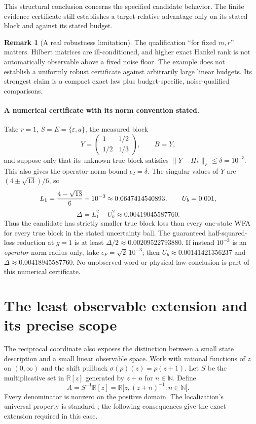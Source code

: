 \documentclass[11pt]{article}
\theoremstyle{definition}
\newtheorem{remark}[theorem]{Remark}
\begin{document}
This structural conclusion concerns the specified candidate behavior.
The finite evidence certificate still establishes a target-relative
advantage only on its stated block and against its stated budget.

\begin{remark}[A real robustness limitation]
The qualification ``for fixed $m,r$'' matters. Hilbert matrices are
ill-conditioned, and higher exact Hankel rank is not automatically
observable above a fixed noise floor. The example does not establish a
uniformly robust certificate against arbitrarily large linear budgets.
Its strongest claim is a compact exact law plus budget-specific,
noise-qualified comparisons.
\end{remark}

\paragraph{A numerical certificate with its norm convention stated.}
Take $r=1$, $S=E=\{\varepsilon,a\}$, the measured block
\[
 Y=\begin{pmatrix}1&1/2\\1/2&1/3\end{pmatrix},
 \qquad B=Y,
\]
and suppose only that its unknown true block satisfies
$\|Y-H_*\|_F\leq\delta=10^{-3}$. This also gives the operator-norm
bound $\epsilon_2=\delta$. The singular values of $Y$ are
$(4\pm\sqrt{13})/6$, so
\[
 L_1={4-\sqrt{13}\over6}-10^{-3}
     \approx0.0647414540893,
 \qquad U_b=0.001,
\]
\[
 \Delta=L_1^2-U_b^2\approx0.00419045587760.
\]
Thus the candidate has strictly smaller true block loss than every
one-state WFA for every true block in the stated uncertainty ball. The
guaranteed half-squared-loss reduction at $g=1$ is at least
$\Delta/2\approx0.00209522793880$. If instead $10^{-3}$ is an
\emph{operator}-norm radius only, take $\epsilon_F=\sqrt2\,10^{-3}$;
then $U_b\approx0.00141421356237$ and
$\Delta\approx0.00418945587760$. No unobserved-word or physical-law
conclusion is part of this numerical certificate.

\section{The least observable extension and its precise scope}
\label{sec:localization}

The reciprocal coordinate also exposes the distinction between a small
state description and a small linear observable space. Work with rational
functions of $z$ on $(0,\infty)$ and the shift pullback
$\sigma(p)(z)=p(z+1)$. Let $S$ be the multiplicative set in $\mathbb R[z]$
generated by $z+n$ for $n\in\mathbb N$. Define
\[
 A=S^{-1}\mathbb R[z]
   =\mathbb R\bigl[z,(z+n)^{-1}:n\in\mathbb N\bigr].
\]
Every denominator is nonzero on the positive domain. The localization's
universal property is standard \cite{cc-stacks-localization}; the following
consequences give the exact extension required in this case.
\end{document}
